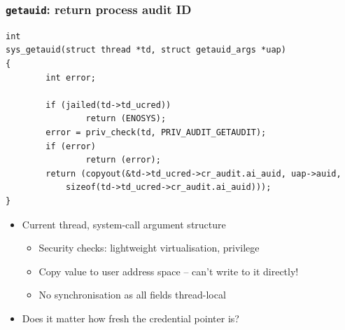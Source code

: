 \begin{frame}[fragile]
  \frametitle{\texttt{getauid}: return process audit ID}

  \begin{scriptsize}
\begin{verbatim}
int
sys_getauid(struct thread *td, struct getauid_args *uap)
{
        int error;

        if (jailed(td->td_ucred))
                return (ENOSYS);
        error = priv_check(td, PRIV_AUDIT_GETAUDIT);
        if (error)
                return (error);
        return (copyout(&td->td_ucred->cr_audit.ai_auid, uap->auid,
            sizeof(td->td_ucred->cr_audit.ai_auid)));
}
\end{verbatim}
  \end{scriptsize}

  \begin{itemize}
    \item Current thread, system-call argument structure
    \begin{itemize}
      \item Security checks: lightweight virtualisation, privilege
      \item Copy value to user address space -- can't write to it directly!
      \item No synchronisation as all fields thread-local
    \end{itemize}

    \pause

    \item Does it matter how fresh the credential pointer is?
  \end{itemize}
\end{frame}

